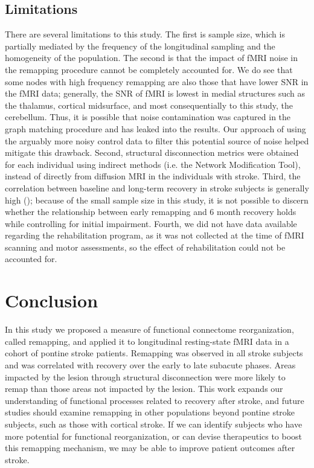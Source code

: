 \documentclass[phd,tocprelim]{cornell}
\begin{document}
	
	\subsection{Limitations}
	There are several limitations to this study. The first is sample size, which is partially mediated by the frequency of the longitudinal sampling and the homogeneity of the population. The second is that the impact of fMRI noise in the remapping procedure cannot be completely accounted for. We do see that some nodes with high frequency remapping are also those that have lower SNR in the fMRI data; generally, the SNR of fMRI is lowest in medial structures such as the thalamus, cortical midsurface, and most consequentially to this study, the cerebellum. Thus, it is possible that noise contamination was captured in the graph matching procedure and has leaked into the results. Our approach of using the arguably more noisy control data to filter this potential source of noise helped mitigate this drawback. Second, structural disconnection metrics were obtained for each individual using indirect methods (i.e. the Network Modification Tool), instead of directly from diffusion MRI in the individuals with stroke. Third, the correlation between baseline and long-term recovery in stroke subjects is generally high (\cite{Krakauer2015-sy}); because of the small sample size in this study, it is not possible to discern whether the relationship between early remapping and 6 month recovery holds while controlling for initial impairment. Fourth, we did not have data available regarding the rehabilitation program, as it was not collected at the time of fMRI scanning and motor assessments, so the effect of rehabilitation could not be accounted for. 

\section{Conclusion}
	In this study we proposed a measure of functional connectome reorganization, called remapping, and applied it to longitudinal resting-state fMRI data in a cohort of pontine stroke patients. Remapping was observed in all stroke subjects and was correlated with recovery over the early to late subacute phases. Areas impacted by the lesion through structural disconnection were more likely to remap than those areas not impacted by the lesion. This work expands our understanding of functional processes related to recovery after stroke, and future studies should examine remapping in other populations beyond pontine stroke subjects, such as those with cortical stroke. If we can identify subjects who have more potential for functional reorganization, or can devise therapeutics to boost this remapping mechanism, we may be able to improve patient outcomes after stroke.
	
\end{document}
